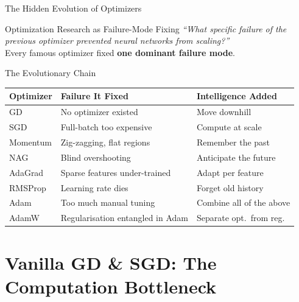 \documentclass{beamer}
\begin{document}
\begin{frame}[shrink=10]{The Hidden Evolution of Optimizers}
  \begin{block}{Optimization Research as Failure-Mode Fixing}
    \textit{``What specific failure of the previous optimizer
    prevented neural networks from scaling?''}\\[6pt]
    Every famous optimizer fixed \textbf{one dominant failure mode}.
  \end{block}

  \medskip

  \begin{block}{The Evolutionary Chain}
    \centering
    \renewcommand{\arraystretch}{1.35}
    \begin{tabular}{lll}
      \toprule
      \textbf{Optimizer} & \textbf{Failure It Fixed} & \textbf{Intelligence Added}\\
      \midrule
      GD        & No optimizer existed              & Move downhill\\
      SGD       & Full-batch too expensive          & Compute at scale\\
      Momentum  & Zig-zagging, flat regions         & Remember the past\\
      NAG       & Blind overshooting                & Anticipate the future\\
      AdaGrad   & Sparse features under-trained     & Adapt per feature\\
      RMSProp   & Learning rate dies                & Forget old history\\
      Adam      & Too much manual tuning            & Combine all of the above\\
      AdamW     & Regularisation entangled in Adam  & Separate opt.\ from reg.\\
      \bottomrule
    \end{tabular}
  \end{block}
\end{frame}

\section{Vanilla GD \& SGD: The Computation Bottleneck}
\end{document}
